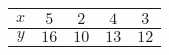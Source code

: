 \begin{tabular}[12pt]{ |c| c| c| c| c| }
    \hline
	$x$ & $5$ & $2$ & $4$ & $3$ \\
   \hline	
   	$y$ & $16$ & $10$ & $13$ & $12$ \\
   	\hline
\end{tabular}
